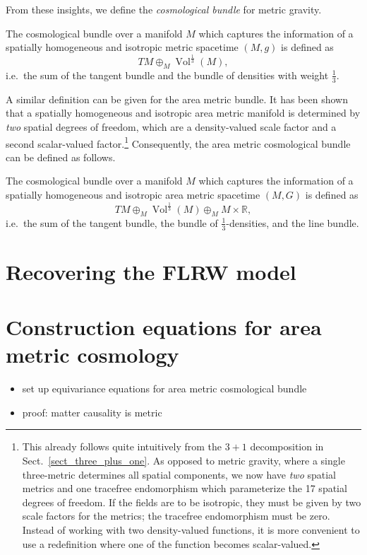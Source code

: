 From these insights, we define the \emph{cosmological bundle} for metric gravity.
\begin{definition}
  The cosmological bundle over a manifold $M$ which captures the information of a spatially homogeneous and isotropic metric spacetime $(M,g)$ is defined as
  \begin{equation}
    TM \oplus_M \operatorname{Vol}^{\frac{1}{3}}(M),
  \end{equation}
  i.e.\ the sum of the tangent bundle and the bundle of densities with weight $\frac{1}{3}$.
\end{definition}
A similar definition can be given for the area metric bundle. It has been shown \cite{Duell_2020} that a spatially homogeneous and isotropic area metric manifold is determined by \emph{two} spatial degrees of freedom, which are a density-valued scale factor and a second scalar-valued factor.\footnote{This already follows quite intuitively from the $3+1$ decomposition in Sect.~\ref{sect_three_plus_one}. As opposed to metric gravity, where a single three-metric determines all spatial components, we now have \emph{two} spatial metrics and one tracefree endomorphism which parameterize the 17 spatial degrees of freedom. If the fields are to be isotropic, they must be given by two scale factors for the metrics; the tracefree endomorphism must be zero. Instead of working with two density-valued functions, it is more convenient to use a redefinition where one of the function becomes scalar-valued.} Consequently, the area metric cosmological bundle can be defined as follows.
\begin{definition}
  The cosmological bundle over a manifold $M$ which captures the information of a spatially homogeneous and isotropic area metric spacetime $(M,G)$ is defined as
  \begin{equation}
    TM \oplus_M \operatorname{Vol}^{\frac{1}{3}}(M) \oplus_M M\times\mathbb R,
  \end{equation}
  i.e.\ the sum of the tangent bundle, the bundle of $\frac{1}{3}$-densities, and the line bundle.
\end{definition}

\section{Recovering the FLRW model}

\newpage

\section{Construction equations for area metric cosmology}
\begin{itemize}
\item set up equivariance equations for area metric cosmological bundle
\item proof: matter causality is metric
\end{itemize}


